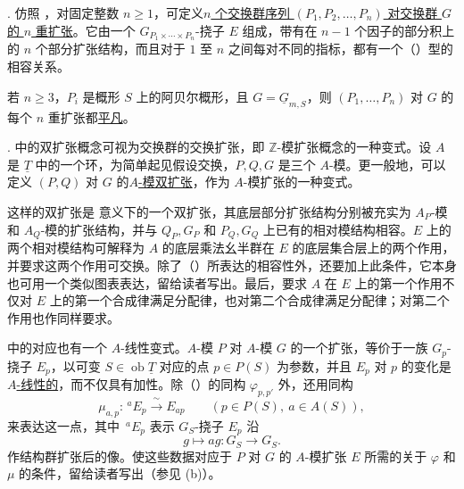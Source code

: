 . 仿照 ，对固定整数 $n\geq1$，可定义\underline{$n$ 个交换群序列 $(P_1,P_2,\ldots,P_n)$ 对交换群 $G$ 的 $n$ 重扩张}。它由一个 $G_{P_1\times\cdots\times P_n}$-挠子 $E$ 组成，带有在 $n-1$ 个因子的部分积上的 $n$ 个部分扩张结构，而且对于 $1$ 至 $n$ 之间每对不同的指标，都有一个（）型的相容关系。

若 $n\geq3$，$P_i$ 是概形 $S$ 上的阿贝尔概形，且 $G=\underline G_{m,S}$，则 $(P_1,\ldots,P_n)$ 对 $G$ 的每个 $n$ 重扩张都\underline{平凡}。

.  中的双扩张概念可视为交换群的交换扩张，即 $\mathbb Z$-模扩张概念的一种变式。设 $A$ 是 $\underline T$ 中的一个环，为简单起见假设交换，$P,Q,G$ 是三个 $A$-模。更一般地，可以定义 $(P,Q)$ 对 $G$ 的\underline{$A$-模双扩张}，作为 $A$-模扩张的一种变式。

这样的双扩张是  意义下的一个双扩张，其底层部分扩张结构分别被充实为 $A_P$-模和 $A_Q$-模的扩张结构，并与 $Q_P,G_P$ 和 $P_Q,G_Q$ 上已有的相对模结构相容。$E$ 上的两个相对模结构可解释为 $A$ 的底层乘法幺半群在 $E$ 的底层集合层上的两个作用，并要求这两个作用可交换。除了（）所表达的相容性外，还要加上此条件，它本身也可用一个类似图表表达，留给读者写出。最后，要求 $A$ 在 $E$ 上的第一个作用不仅对 $E$ 上的第一个合成律满足分配律，也对第二个合成律满足分配律；对第二个作用也作同样要求。

 中的对应也有一个 $A$-线性变式。$A$-模 $P$ 对 $A$-模 $G$ 的一个扩张，等价于一族 $G_p$-挠子 $E_p$，以可变 $S\in\operatorname{ob}\underline T$ 对应的点 $p\in P(S)$ 为参数，并且 $E_p$ 对 $p$ 的变化是\underline{$A$-线性的}，而不仅具有加性。除（）的同构 $\varphi_{p,p'}$ 外，还用同构
\[
 \mu_{a,p}:\,{}^{a}E_p\xrightarrow{\ \sim\ }E_{ap}
 \qquad(p\in P(S),\ a\in A(S)),
\]
来表达这一点，其中 $\,{}^{a}E_p$ 表示 $G_S$-挠子 $E_p$ 沿
\[
 g\longmapsto ag:G_S\longrightarrow G_S.
\]
作结构群扩张后的像。使这些数据对应于 $P$ 对 $G$ 的 $A$-模扩张 $E$ 所需的关于 $\varphi$ 和 $\mu$ 的条件，留给读者写出（参见 (b)）。







